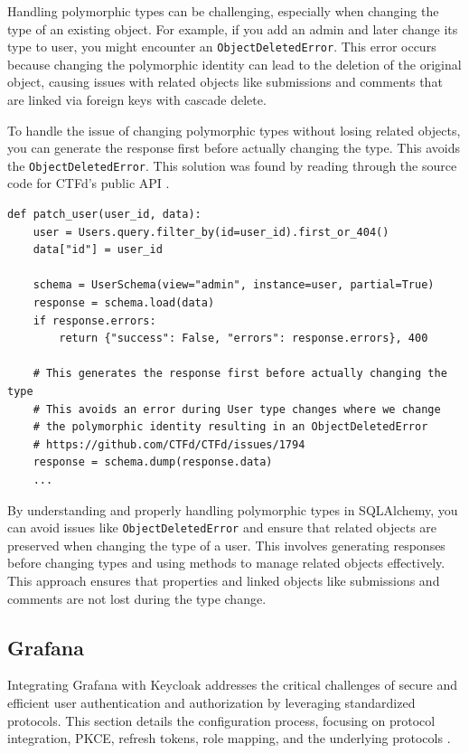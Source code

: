 Handling polymorphic types can be challenging, especially when changing the type of an existing object. For example, if you add an admin and later change its type to user, you might encounter an \texttt{ObjectDeletedError}. This error occurs because changing the polymorphic identity can lead to the deletion of the original object, causing issues with related objects like submissions and comments that are linked via foreign keys with cascade delete.

To handle the issue of changing polymorphic types without losing related objects, you can generate the response first before actually changing the type. This avoids the \texttt{ObjectDeletedError}. This solution was found by reading through the source code for CTFd's public API \cite{CTFdUsersAPI}.

\begin{verbatim}
def patch_user(user_id, data):
    user = Users.query.filter_by(id=user_id).first_or_404()
    data["id"] = user_id

    schema = UserSchema(view="admin", instance=user, partial=True)
    response = schema.load(data)
    if response.errors:
        return {"success": False, "errors": response.errors}, 400

    # This generates the response first before actually changing the type
    # This avoids an error during User type changes where we change
    # the polymorphic identity resulting in an ObjectDeletedError
    # https://github.com/CTFd/CTFd/issues/1794
    response = schema.dump(response.data)
    ...
\end{verbatim}

By understanding and properly handling polymorphic types in SQLAlchemy, you can avoid issues like \texttt{ObjectDeletedError} and ensure that related objects are preserved when changing the type of a user. This involves generating responses before changing types and using methods to manage related objects effectively. This approach ensures that properties and linked objects like submissions and comments are not lost during the type change.

\subsection{Grafana}\label{sec:grafana_auth}
Integrating Grafana with Keycloak addresses the critical challenges of secure and efficient user authentication and authorization by leveraging standardized protocols. This section details the configuration process, focusing on protocol integration, PKCE, refresh tokens, role mapping, and the underlying protocols \parencite{GrafanaKeycloak}.

